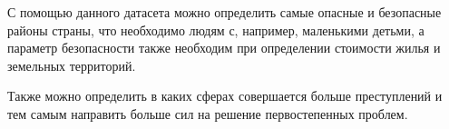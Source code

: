 \documentclass[12pt,a4paper]{article}
\begin{document}
	С помощью данного датасета можно определить самые опасные и безопасные районы страны, что необходимо людям с, например, маленькими детьми, а параметр безопасности также необходим при определении стоимости жилья и земельных территорий.\par
	Также можно определить в каких сферах совершается больше преступлений и тем самым направить больше сил на решение первостепенных проблем.	
	
	
	
	
	
	
	
	
	
	
	
\end{document}
